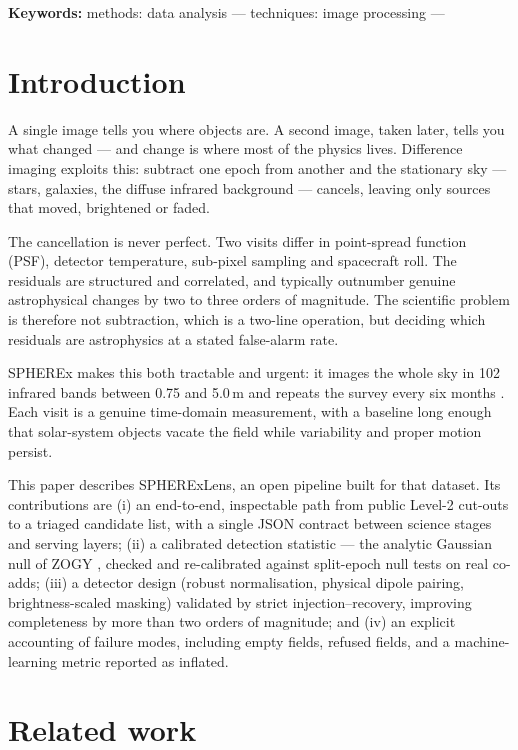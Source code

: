 \documentclass[11pt,a4paper]{article}
\begin{document}
\vspace{2pt}
{\small\noindent\textbf{Keywords:} methods: data analysis --- techniques: image processing ---

\section{Introduction}

A single image tells you where objects are. A second image, taken later, tells you what changed ---
and change is where most of the physics lives. Difference imaging exploits this: subtract one epoch
from another and the stationary sky --- stars, galaxies, the diffuse infrared background ---
cancels, leaving only sources that moved, brightened or faded.

The cancellation is never perfect. Two visits differ in point-spread function (PSF), detector
temperature, sub-pixel sampling and spacecraft roll. The residuals are structured and correlated,
and typically outnumber genuine astrophysical changes by two to three orders of magnitude. The
scientific problem is therefore not subtraction, which is a two-line operation, but deciding which
residuals are astrophysics at a stated false-alarm rate.

SPHEREx makes this both tractable and urgent: it images the whole sky in 102 infrared bands between
0.75 and 5.0\,\textmu m and repeats the survey every six months \cite{spherex}. Each visit is a
genuine time-domain measurement, with a baseline long enough that solar-system objects vacate the
field while variability and proper motion persist.

This paper describes SPHERExLens, an open pipeline built for that dataset. Its contributions are
(i) an end-to-end, inspectable path from public Level-2 cut-outs to a triaged candidate list, with a
single JSON contract between science stages and serving layers; (ii) a calibrated detection
statistic --- the analytic Gaussian null of ZOGY \cite{zogy}, checked and re-calibrated against
split-epoch null tests on real co-adds; (iii) a detector design (robust normalisation, physical
dipole pairing, brightness-scaled masking) validated by strict injection--recovery, improving
completeness by more than two orders of magnitude; and (iv) an explicit accounting of failure modes,
including empty fields, refused fields, and a machine-learning metric reported as inflated.

\section{Related work}

}
\end{document}
